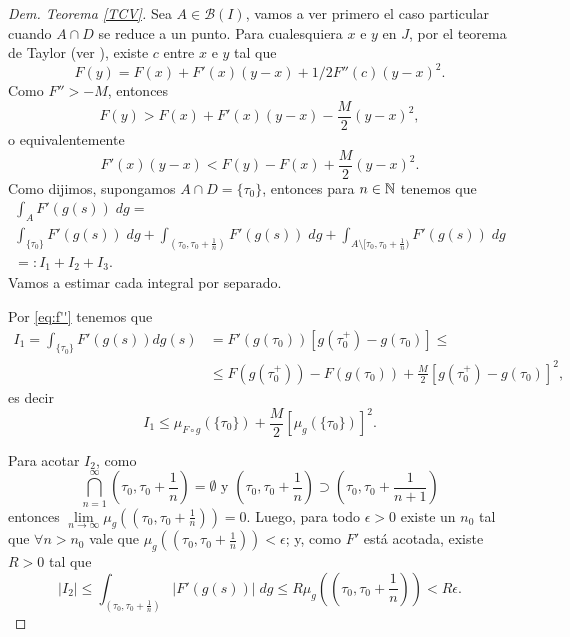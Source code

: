 \begin{proof}[Dem. Teorema \eqref{TCV}]
Sea $A\in \mathcal{B}(I)$, vamos a ver primero el caso particular cuando
$A\cap D$ se reduce a un punto.
 Para cualesquiera $x$ e $y$ en $J$, por el teorema de Taylor (ver \cite[pg 13]{Evans}), existe $c$ entre $x$ e $y$ tal que
		$$F(y)=F(x)+F'(x)(y-x)+1/2F''(c)(y-x)^2.$$
		Como $F''>-M $, entonces
		$$F(y)>F(x)+F'(x)(y-x)-\frac{M}{2}(y-x)^2,$$ 
		o equivalentemente 
		\begin{equation}	\label{eq:f''}
			F'(x)(y-x)<F(y)-F(x)+\frac{M}{2}(y-x)^2.
		\end{equation}
		Como dijimos, supongamos  $A\cap D=\{\tau_0\}$, entonces para $n\in \mathbb{N}$ tenemos que
		\begin{multline*}
			\int_AF'(g(s))\; dg=\\ \int_{\{\tau_0\}}F'(g(s))\; dg+\int_{(\tau_0,\tau_0+\frac{1}{n})}F'(g(s))\; dg+ \int_{A\setminus [\tau_0,\tau_0+\frac{1}{n})}F'(g(s))\; dg\\
             =:I_1+I_2+I_3.
		\end{multline*}
		Vamos a estimar cada integral por separado.
  
 Por \eqref{eq:f''} tenemos que
		\begin{equation*}
  \begin{split}
		I_1=\int_{\{\tau_0\}}F'(g(s))dg(s)&=F'(g(\tau_0))\left[g(\tau_0^+)-g(\tau_0) \right]\leq\\
		&\leq F(g(\tau_0^+))- F(g(\tau_0))+\frac{M}{2}\left[ g(\tau_0^+)-g(\tau_0)\right]^2,
  \end{split}
	\end{equation*}
	es decir
		\begin{equation}
			\label{eq:obs1}
			I_1\leq \mu_{F\circ g}(\{\tau_0\})+\frac{M}{2}\left[ \mu_{g}(\{\tau_0\})\right]^2 .
		\end{equation} 
	
Para acotar $I_2$, como $$\bigcap_{n=1}^{\infty}\left( \tau_0,\tau_0+\frac{1}{n}\right) =\emptyset \text{ y }  \left( \tau_0,\tau_0+\frac{1}{n}\right) \supset \left( \tau_0,\tau_0+\frac{1}{n+1}\right) $$
	entonces $\lim\limits_{n\to \infty}\mu_{g}\left( \left( \tau_0,\tau_0+\frac{1}{n}\right)\right)=0 $. 
Luego, para todo $\epsilon>0$ existe un $n_0$ tal que $\forall n>n_0$ vale que   $\mu_{g}\left( \left( \tau_0,\tau_0+\frac{1}{n}\right)\right)<\epsilon$; y,  como $F'$ está acotada, existe $R>0$ tal que 
\begin{equation*}
	\left|I_2\right| \leq\int_{(\tau_0,\tau_0+\frac{1}{n})}|F'(g(s))|\; dg 
  \leq R \mu_{g}\left( \left( \tau_0,\tau_0+\frac{1}{n}\right)\right)<R\epsilon. 
\end{equation*}


\end{proof}
